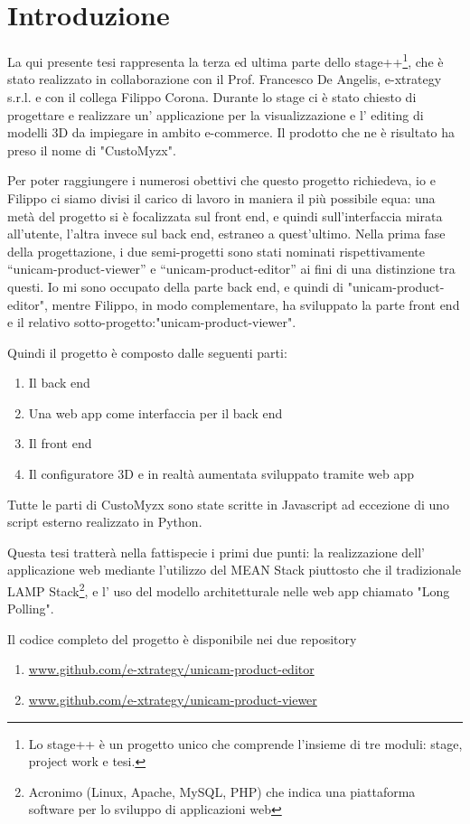 \chapter{Introduzione}
\label{chap:intro}
La qui presente tesi rappresenta la terza ed ultima parte dello stage++\footnote{Lo stage++ è un progetto unico che comprende l'insieme di tre moduli: stage, project work e tesi.}, che è stato realizzato in collaborazione con il Prof. Francesco De Angelis, e-xtrategy s.r.l. e con il collega Filippo Corona.
Durante lo stage ci è stato chiesto di progettare e realizzare un’ applicazione per la visualizzazione e l' editing di modelli
3D da impiegare in ambito e-commerce.
Il prodotto che ne è risultato ha preso il nome di "CustoMyzx".

Per poter raggiungere i numerosi obettivi che questo progetto richiedeva, io e Filippo ci siamo divisi il carico di lavoro in maniera il più possibile equa: una metà del progetto si è focalizzata sul front end, e quindi sull’interfaccia mirata all’utente, l’altra invece sul back end, estraneo a quest’ultimo.
Nella prima fase della progettazione, i due semi-progetti sono stati nominati rispettivamente “unicam-product-viewer” e “unicam-product-editor” ai fini di una distinzione tra questi.
Io mi sono occupato della parte back end, e quindi di "unicam-product-editor", mentre Filippo, in modo complementare, ha sviluppato la parte front end e il relativo sotto-progetto:"unicam-product-viewer".

Quindi il progetto è composto dalle seguenti parti:
\begin{enumerate}
	\item Il back end
	\item Una web app come interfaccia per il back end
	\item Il front end
	\item Il configuratore 3D e in realtà aumentata sviluppato tramite web app
\end{enumerate}
Tutte le parti di CustoMyzx sono state scritte in Javascript ad eccezione di uno script esterno realizzato in Python.

Questa tesi tratterà nella fattispecie i primi due punti: la realizzazione dell' applicazione web mediante l'utilizzo del MEAN Stack piuttosto che il tradizionale LAMP Stack\footnote{Acronimo (Linux, Apache, MySQL, PHP) che indica una piattaforma software per lo sviluppo di applicazioni web}, e l' uso del modello architetturale nelle web app chiamato "Long Polling".

Il codice completo del progetto è disponibile nei due repository
\begin{enumerate}
	\item \url{www.github.com/e-xtrategy/unicam-product-editor}
	\item \url{www.github.com/e-xtrategy/unicam-product-viewer}
\end{enumerate} 

